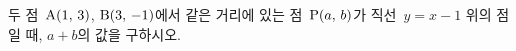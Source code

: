두 점~$\mathrm{A}(1,\mkern3mu 3)$, $\mathrm{B}(3,\mkern3mu -1)$에서 같은 거리에 있는 점~$\mathrm{P}(a,\mkern3mu b)$가 직선~$y=x-1$ 위의 점일 때, $a+b$의 값을 구하시오.
